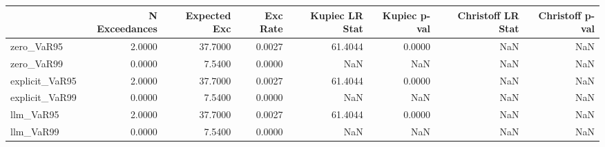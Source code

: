 \begin{tabular}{lrrrrrrr}
\toprule
 & N Exceedances & Expected Exc & Exc Rate & Kupiec LR Stat & Kupiec p-val & Christoff LR Stat & Christoff p-val \\
\midrule
zero_VaR95 & 2.0000 & 37.7000 & 0.0027 & 61.4044 & 0.0000 & NaN & NaN \\
zero_VaR99 & 0.0000 & 7.5400 & 0.0000 & NaN & NaN & NaN & NaN \\
explicit_VaR95 & 2.0000 & 37.7000 & 0.0027 & 61.4044 & 0.0000 & NaN & NaN \\
explicit_VaR99 & 0.0000 & 7.5400 & 0.0000 & NaN & NaN & NaN & NaN \\
llm_VaR95 & 2.0000 & 37.7000 & 0.0027 & 61.4044 & 0.0000 & NaN & NaN \\
llm_VaR99 & 0.0000 & 7.5400 & 0.0000 & NaN & NaN & NaN & NaN \\
\bottomrule
\end{tabular}
